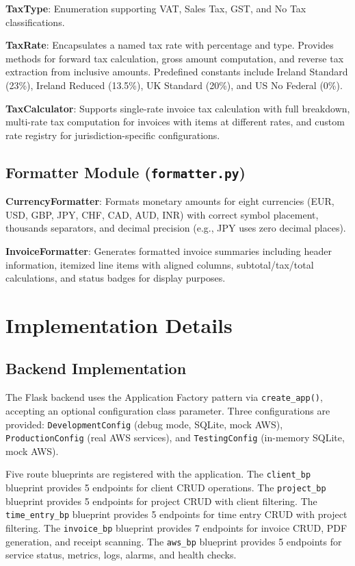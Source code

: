 \documentclass[conference]{IEEEtran}
\begin{document}
\textbf{TaxType}: Enumeration supporting VAT, Sales Tax, GST, and No Tax classifications.

\textbf{TaxRate}: Encapsulates a named tax rate with percentage and type. Provides methods for forward tax calculation, gross amount computation, and reverse tax extraction from inclusive amounts. Predefined constants include Ireland Standard (23\%), Ireland Reduced (13.5\%), UK Standard (20\%), and US No Federal (0\%).

\textbf{TaxCalculator}: Supports single-rate invoice tax calculation with full breakdown, multi-rate tax computation for invoices with items at different rates, and custom rate registry for jurisdiction-specific configurations.

\subsection{Formatter Module (\texttt{formatter.py})}

\textbf{CurrencyFormatter}: Formats monetary amounts for eight currencies (EUR, USD, GBP, JPY, CHF, CAD, AUD, INR) with correct symbol placement, thousands separators, and decimal precision (e.g., JPY uses zero decimal places).

\textbf{InvoiceFormatter}: Generates formatted invoice summaries including header information, itemized line items with aligned columns, subtotal/tax/total calculations, and status badges for display purposes.

\section{Implementation Details}

\subsection{Backend Implementation}

The Flask backend uses the Application Factory pattern via \texttt{create\_app()}, accepting an optional configuration class parameter. Three configurations are provided: \texttt{DevelopmentConfig} (debug mode, SQLite, mock AWS), \texttt{ProductionConfig} (real AWS services), and \texttt{TestingConfig} (in-memory SQLite, mock AWS).

Five route blueprints are registered with the application. The \texttt{client\_bp} blueprint provides 5 endpoints for client CRUD operations. The \texttt{project\_bp} blueprint provides 5 endpoints for project CRUD with client filtering. The \texttt{time\_entry\_bp} blueprint provides 5 endpoints for time entry CRUD with project filtering. The \texttt{invoice\_bp} blueprint provides 7 endpoints for invoice CRUD, PDF generation, and receipt scanning. The \texttt{aws\_bp} blueprint provides 5 endpoints for service status, metrics, logs, alarms, and health checks.
\end{document}
